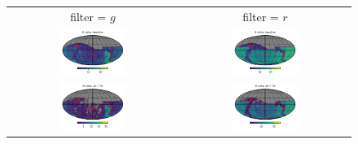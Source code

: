 \documentclass[preprintm,linenumbers]{aastex631}
\begin{document}
\begin{figure}
   		\centering
			\begin{tabular}{c c}
          filter = $g$ &  filter = $r$\\
   		\includegraphics[width=0.4\textwidth]{results/skymaps_cutout/skymaps_cutout_first_year_one_snap_v4_0_10yrs_db_noDD_noTwi_nside-256_CountMetric_g_noDD_noTwi.pdf} &
   		\includegraphics[width=0.4\textwidth]{results/skymaps_cutout/skymaps_cutout_first_year_one_snap_v4_0_10yrs_db_noDD_noTwi_nside-256_CountMetric_r_noDD_noTwi.pdf} \\

         \includegraphics[width=0.4\textwidth]{results/skymaps_cutout/skymaps_cutout_first_year_one_snap_v4_0_10yrs_db_noDD_noTwi_tscale-7_nside-256_doAllTemplateMetrics_reduceCount_g_noDD_noTwi.pdf} &
         \includegraphics[width=0.4\textwidth]{results/skymaps_cutout/skymaps_cutout_first_year_one_snap_v4_0_10yrs_db_noDD_noTwi_tscale-7_nside-256_doAllTemplateMetrics_reduceCount_r_noDD_noTwi.pdf} \\


\end{tabular}
\end{figure}
\end{document}
